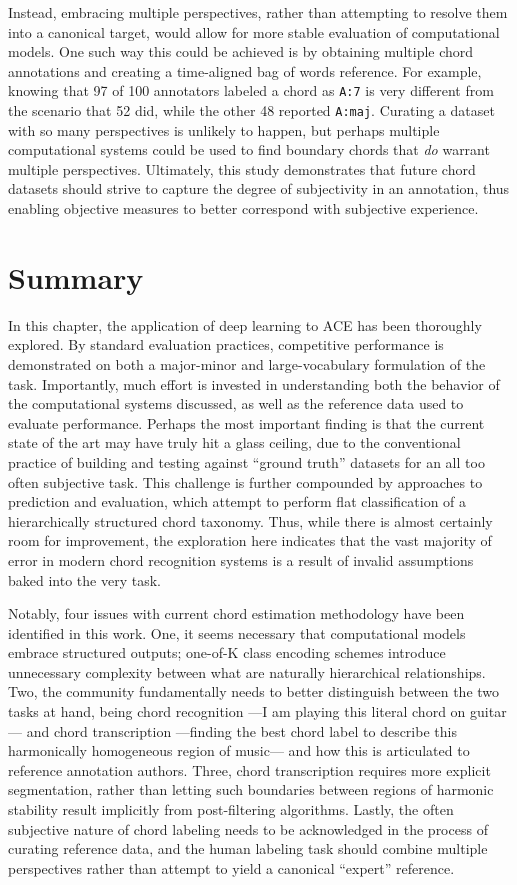 Instead, embracing multiple perspectives, rather than attempting to resolve them into a canonical target, would allow for more stable evaluation of computational models.
One such way this could be achieved is by obtaining multiple chord annotations and creating a time-aligned bag of words reference.
For example, knowing that 97 of 100 annotators labeled a chord as \texttt{A:7} is very different from the scenario that 52 did, while the other 48 reported \texttt{A:maj}.
Curating a dataset with so many perspectives is unlikely to happen, but perhaps multiple computational systems could be used to find boundary chords that \emph{do} warrant multiple perspectives.
Ultimately, this study demonstrates that future chord datasets should strive to capture the degree of subjectivity in an annotation, thus enabling objective measures to better correspond with subjective experience.


\section{Summary}
\label{sec:summary}

In this chapter, the application of deep learning to ACE has been thoroughly explored.
By standard evaluation practices, competitive performance is demonstrated on both a major-minor and large-vocabulary formulation of the task.
Importantly, much effort is invested in understanding both the behavior of the computational systems discussed, as well as the reference data used to evaluate performance.
Perhaps the most important finding is that the current state of the art may have truly hit a glass ceiling, due to the conventional practice of building and testing against ``ground truth'' datasets for an all too often subjective task.
This challenge is further compounded by approaches to prediction and evaluation, which attempt to perform flat classification of a hierarchically structured chord taxonomy.
Thus, while there is almost certainly room for improvement, the exploration here indicates that the vast majority of error in modern chord recognition systems is a result of invalid assumptions baked into the very task.

Notably, four issues with current chord estimation methodology have been identified in this work.
One, it seems necessary that computational models embrace structured outputs; one-of-K class encoding schemes introduce unnecessary complexity between what are naturally hierarchical relationships.
Two, the community fundamentally needs to better distinguish between the two tasks at hand, being chord recognition ---I am playing this literal chord on guitar--- and chord transcription ---finding the best chord label to describe this harmonically homogeneous region of music--- and how this is articulated to reference annotation authors.
Three, chord transcription requires more explicit segmentation, rather than letting such boundaries between regions of harmonic stability result implicitly from post-filtering algorithms.
Lastly, the often subjective nature of chord labeling needs to be acknowledged in the process of curating reference data, and the human labeling task should combine multiple perspectives rather than attempt to yield a canonical ``expert'' reference.
